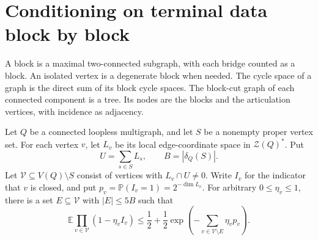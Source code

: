 \section{Conditioning on terminal data block by block}
\label{sec:second-order-block-conditioning}

A block is a maximal two-connected subgraph, with each bridge counted as a block.
An isolated vertex is a degenerate block when needed.
The cycle space of a graph is the direct sum of its block cycle spaces.
The block-cut graph of each connected component is a tree.
Its nodes are the blocks and the articulation vertices, with incidence as adjacency.

\begin{lemma}\label{lem:weighted-block-conditioning}
Let $Q$ be a connected loopless multigraph, and let $S$ be a nonempty proper vertex set.
For each vertex $v$, let $L_v$ be its local edge-coordinate space in $\mathcal Z(Q)^*$.
Put
\[
 U=\sum_{s\in S}L_s,\qquad B=|\delta_Q(S)|.
\]
Let $\mathcal V\subseteq V(Q)\setminus S$ consist of vertices with $L_v\cap U\ne0$.
Write $I_v$ for the indicator that $v$ is closed, and put
$p_v=\mathbb P(I_v=1)=2^{-\dim L_v}$.
For arbitrary $0\le\eta_v\le1$, there is a set $E\subseteq\mathcal V$ with $|E|\le5B$ such that
\begin{equation}\label{eq:weighted-block-conditioning}
 \mathbb E\prod_{v\in\mathcal V}(1-\eta_v I_v)
 \le\frac12+\frac12\exp\!\left(-\sum_{v\in\mathcal V\setminus E}\eta_v p_v\right).
\end{equation}
\end{lemma}

